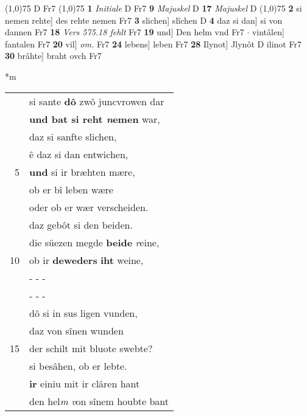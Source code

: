 \documentclass[8pt,a4paper,notitlepage]{article}
\begin{document}
\begin{table}[ht]
\begin{minipage}[t]{0.5\linewidth}
\begin{tabular}{rl}
\end{tabular}
\scriptsize
\line(1,0){75} \newline
D Fr7 \newline
\line(1,0){75} \newline
\textbf{1} \textit{Initiale} D Fr7  \textbf{9} \textit{Majuskel} D  \textbf{17} \textit{Majuskel} D  \newline
\line(1,0){75} \newline
\textbf{2} si nemen rehte] des rehte nemen Fr7 \textbf{3} slichen] slîchen D \textbf{4} daz si dan] si von dannen Fr7 \textbf{18} \textit{Vers 575.18 fehlt} Fr7  \textbf{19} und] Den helm vnd Fr7  $\cdot$ vintâlen] fantalen Fr7 \textbf{20} vil] \textit{om.} Fr7 \textbf{24} lebens] leben Fr7 \textbf{28} Ilynot] Jlynôt D ilinot Fr7 \textbf{30} brâhte] braht ovch Fr7 \newline
\end{minipage}
\hspace{0.5cm}
\begin{minipage}[t]{0.5\linewidth}
\small
\begin{center}*m
\end{center}
\begin{tabular}{rl}
 & si sante \textbf{dô} zwô juncvrowen dar\\ 
 & \textbf{und bat si reht \textit{n}emen} war,\\ 
 & daz si sanfte slichen,\\ 
 & ê daz si dan entwichen,\\ 
5 & \textbf{und} si ir bræhten mære,\\ 
 & ob er bî leben wære\\ 
 & oder ob er wær verscheiden.\\ 
 & daz gebôt si den beiden.\\ 
 & die süezen megde \textbf{beide} \textit{r}eine,\\ 
10 & ob ir \textbf{deweders} \textbf{iht} weine,\\ 
 & \multicolumn{1}{l}{ - - - }\\ 
 & \multicolumn{1}{l}{ - - - }\\ 
 & dô si in sus ligen vunden,\\ 
 & daz von sînen wunden\\ 
15 & der schilt mit bluote swebte?\\ 
 & si besâhen, ob er lebte.\\ 
 & \textbf{ir} einiu mit ir clâren hant\\ 
 & den hel\textit{m} \textit{v}on sînem houbte bant\\ 

\end{tabular}
\end{minipage}
\end{table}
\end{document}
